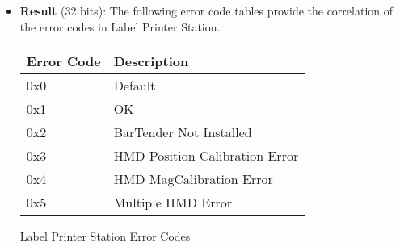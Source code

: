 \documentclass[letterpaper]{article}
\begin{document}
\begin{itemize}
    \item {\bfseries Result} (32 bits): The following error code tables provide the correlation of the error codes in Label Printer Station.
    
        \begin{minipage}{\linewidth}
            \centering
                \begin{tabular}{ | l | p{5cm} |}
                \hline
                \cellcolor{lightgray} Error Code & \cellcolor{lightgray} Description \\ \hline
                0x0 & Default \\ \hline
                0x1 & OK \\ \hline
                0x2 & BarTender Not Installed \\ \hline
                0x3 & HMD Position Calibration Error \\ \hline
                0x4 & HMD MagCalibration Error \\ \hline
                0x5 & Multiple HMD Error \\ \hline
                \end{tabular}\par
            \bigskip
            Label Printer Station Error Codes
        \end{minipage}
        
\end{itemize}
\end{document}
